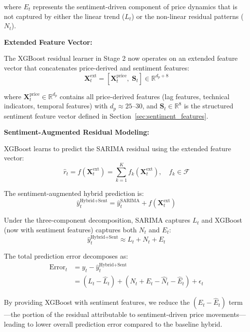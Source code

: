 \documentclass[12pt,a4paper]{article}
\begin{document}
where $E_t$ represents the sentiment-driven component of price dynamics that is not captured by either the linear trend ($L_t$) or the non-linear residual patterns ($N_t$).

\textbf{Extended Feature Vector:}

The XGBoost residual learner in Stage 2 now operates on an extended feature vector that concatenates price-derived and sentiment features:
\begin{equation}
\mathbf{X}_t^{\text{ext}} = \left[\mathbf{X}_t^{\text{price}},\; \mathbf{S}_t\right] \in \mathbb{R}^{d_p + 8}
\end{equation}

where $\mathbf{X}_t^{\text{price}} \in \mathbb{R}^{d_p}$ contains all price-derived features (lag features, technical indicators, temporal features) with $d_p \approx 25$--$30$, and $\mathbf{S}_t \in \mathbb{R}^8$ is the structured sentiment feature vector defined in Section~\ref{sec:sentiment_features}.

\textbf{Sentiment-Augmented Residual Modeling:}

XGBoost learns to predict the SARIMA residual using the extended feature vector:
\begin{equation}
\hat{r}_t = f\left(\mathbf{X}_t^{\text{ext}}\right) = \sum_{k=1}^{K} f_k\left(\mathbf{X}_t^{\text{ext}}\right), \quad f_k \in \mathcal{F}
\end{equation}

The sentiment-augmented hybrid prediction is:
\begin{equation}
\hat{y}_t^{\text{Hybrid+Sent}} = \hat{y}_t^{\text{SARIMA}} + f\left(\mathbf{X}_t^{\text{ext}}\right)
\end{equation}

Under the three-component decomposition, SARIMA captures $L_t$ and XGBoost (now with sentiment features) captures both $N_t$ and $E_t$:
\begin{equation}
\hat{y}_t^{\text{Hybrid+Sent}} \approx L_t + N_t + E_t
\end{equation}

The total prediction error decomposes as:
\begin{align}
\text{Error}_t &= y_t - \hat{y}_t^{\text{Hybrid+Sent}} \nonumber \\
&= (L_t - \hat{L}_t) + (N_t + E_t - \hat{N}_t - \hat{E}_t) + \epsilon_t
\end{align}

By providing XGBoost with sentiment features, we reduce the $(E_t - \hat{E}_t)$ term---the portion of the residual attributable to sentiment-driven price movements---leading to lower overall prediction error compared to the baseline hybrid.
\end{document}
